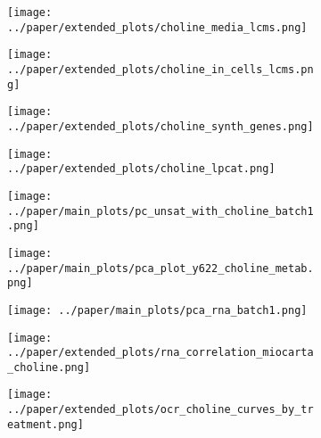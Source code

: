 \begin{figure}[H]
    \begin{subfigure}[t]{.7\textwidth}
        \caption{}
        \texttt{[image: ../paper/extended\_plots/choline\_media\_lcms.png]}        
    \end{subfigure}
    \begin{subfigure}[t]{.3\textwidth}
        \caption{}
        \texttt{[image: ../paper/extended\_plots/choline\_in\_cells\_lcms.png]}        
    \end{subfigure}
    \begin{subfigure}[t]{0.25\textwidth}
        \caption{}
        \texttt{[image: ../paper/extended\_plots/choline\_synth\_genes.png]}        
    \end{subfigure}
    \begin{subfigure}[t]{0.25\textwidth}
        \caption{}
        \texttt{[image: ../paper/extended\_plots/choline\_lpcat.png]}        
    \end{subfigure}
    \begin{subfigure}[t]{.35\textwidth}
        \caption{}
        \texttt{[image: ../paper/main\_plots/pc\_unsat\_with\_choline\_batch1.png]}        
    \end{subfigure} 
    \begin{subfigure}[t]{.25\textwidth}
        \caption{}
        \vspace{.3cm}
        \texttt{[image: ../paper/main\_plots/pca\_plot\_y622\_choline\_metab.png]}        
    \end{subfigure} 
    \begin{subfigure}[t]{0.2\textwidth}
        \caption{}
        \texttt{[image: ../paper/main\_plots/pca\_rna\_batch1.png]}        
    \end{subfigure}  
    \hspace{.25cm}
    \begin{subfigure}[t]{0.2\textwidth}
        \caption{}
        \texttt{[image: ../paper/extended\_plots/rna\_correlation\_miocarta\_choline.png]}        
    \end{subfigure}
    \hspace{.25cm}
    \begin{subfigure}[t]{.25\textwidth}
        \caption{}
        \texttt{[image: ../paper/extended\_plots/ocr\_choline\_curves\_by\_treatment.png]}        
    \end{subfigure}

\end{figure}
